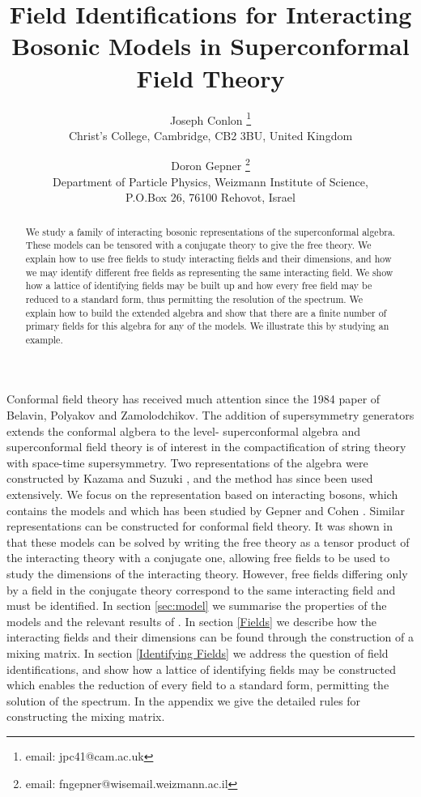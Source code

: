 \documentclass[a4paper,a4paper]{article}
\title{Field Identifications for Interacting Bosonic Models in \myHighlight{$N=2$}\coordHE{} Superconformal Field Theory}
\author{Joseph Conlon \footnote{email: jpc41@cam.ac.uk} \\ Christ's College, Cambridge, CB2 3BU, United Kingdom 
\and Doron Gepner \footnote{email: fngepner@wisemail.weizmann.ac.il}
\\Department of Particle Physics, Weizmann Institute of Science,\\ P.O.Box 26, 76100 Rehovot, Israel}
\begin{document}
\maketitle

\begin{abstract}
We study a family of interacting bosonic representations of the \coordHE{} superconformal algebra. These models can
be tensored with a conjugate theory to give the free theory. We explain how to use
free fields to study interacting fields and their dimensions, and how we may
identify different free fields as representing the same interacting field. We show how a lattice of identifying fields
may be built up and how every free field may be reduced to a standard form, thus permitting the resolution of the spectrum. 
We explain how to build the extended algebra and show that there are a finite number of primary fields for
this algebra for any of the models.
We illustrate this by studying an example.
\end{abstract}

Conformal field theory has received much attention since the 1984 paper of Belavin, Polyakov
and Zamolodchikov\cite{Belavin}. The addition of \coordHE{} supersymmetry generators extends the
conformal algbera to the level-\coordHE{} superconformal algebra and \coordHE{} superconformal field theory is
of interest in the compactification of string theory with \coordHE{} space-time supersymmetry. \cite{Trieste} Two representations of 
the \coordHE{} algebra were constructed by Kazama and Suzuki \cite{Kazama1}\cite{Kazama2}, and the \coordHE{} method has since 
been used extensively. We focus on the representation based on interacting bosons, which contains the \coordHE{} models and which
has been studied by Gepner and Cohen \cite{Gepner}\cite{Cohen}. Similar representations can be constructed for \coordHE{}
conformal field theory\cite{Kiritsis}.
It was shown in \cite{Gepner} that these models can be solved by writing the free theory as a tensor
product of the interacting theory with a conjugate one, allowing free fields to be used to study the dimensions of the interacting theory.
However,
free fields differing only by a field in the conjugate theory correspond to the same interacting field and must
be identified. 
In section \ref{sec:model} we summarise the properties of the models and the relevant results of \cite{Kazama2}\cite{Gepner}\cite{Cohen}. 
In section \ref{Fields} we describe how
the interacting fields and their dimensions can be found through the construction of a mixing matrix.
 In section \ref{Identifying Fields} we address the question of field identifications, and show how a
lattice of identifying fields may be constructed which enables the reduction of every field to a standard form, permitting the solution 
of the spectrum. In the appendix we give the detailed rules for constructing the mixing matrix.
\end{document}

